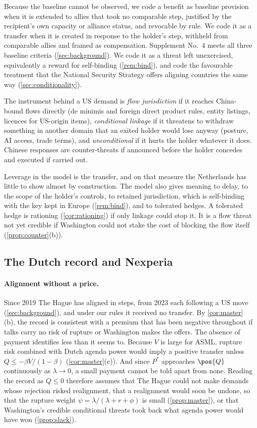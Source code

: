 Because the baseline cannot be observed, we code a benefit as baseline provision when it is extended to allies that took no comparable step, justified by the recipient's own capacity or alliance status, and revocable by rule. We code it as a transfer when it is created in response to the holder's step, withheld from comparable allies and framed as compensation. Supplement No.~4 meets all three baseline criteria (\cref{sec:background}). We code it as a threat left unexercised, equivalently a reward for self-binding (\cref{rem:bind}), and code the favourable treatment that the National Security Strategy offers aligning countries the same way (\cref{sec:conditionality}).

The instrument behind a US demand is \emph{flow jurisdiction} if it reaches China-bound flows directly (de minimis and foreign direct product rules, entity listings, licences for US-origin items), \emph{conditional linkage} if it threatens to withdraw something in another domain that an exited holder would lose anyway (posture, AI access, trade terms), and \emph{unconditional} if it hurts the holder whatever it does. Chinese responses are counter-threats if announced before the holder concedes and executed if carried out.

Leverage in the model is the transfer, and on that measure the Netherlands has little to show almost by construction. The model also gives meaning to delay, to the scope of the holder's controls, to retained jurisdiction, which is self-binding with the key kept in Europe (\cref{rem:bind}), and to tolerated hedges. A tolerated hedge is rationing (\cref{cor:rationing}) if only linkage could stop it. It is a flow threat not yet credible if Washington could not stake the cost of blocking the flow itself (\cref{prop:counter}(b)).

\subsection{The Dutch record and Nexperia}\label{sec:record}

\paragraph{Alignment without a price.} Since 2019 The Hague has aligned in steps, from 2023 each following a US move (\cref{sec:background}), and under our rules it received no transfer. By \cref{cor:master}(b), the record is consistent with a premium that has been negative throughout if talks carry no risk of rupture or Washington makes the offers. The absence of payment identifies less than it seems to. Because $V$ is large for ASML, rupture risk combined with Dutch agenda power would imply a positive transfer unless $Q\le-\beta V/(1-\beta)$ (\cref{cor:master}(c)). And since $P^*$ approaches $\pos{Q}$ continuously as $\lambda\to 0$, a small payment cannot be told apart from none. Reading the record as $Q\le0$ therefore assumes that The Hague could not make demands whose rejection risked realignment, that a realignment would soon be undone, so that the rupture weight $\psi=\lambda/(\lambda+r+\phi)$ is small (\cref{prop:master}), or that Washington's credible conditional threats took back what agenda power would have won (\cref{prop:slack}).

